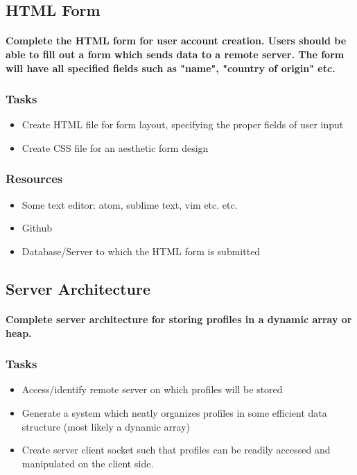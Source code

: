 \documentclass[12pt]{article}
\begin{document}
		\subsection{\bf HTML Form }
			\paragraph{Complete the HTML form for user account creation. Users should be able to fill out a form which sends data to a remote server. The form will have all specified fields such as "name", "country of origin" etc.}
			\subsubsection{\bf Tasks}
				\begin{itemize}
					\item Create HTML file for form layout, specifying the proper fields of user input
					\item Create CSS file for an aesthetic form design
				\end{itemize}
	  	\subsubsection{\bf Resources}
				\begin{itemize}
 					\item Some text editor: atom, sublime text, vim etc. etc.
 					\item Github
			 		\item Database/Server to which the HTML form is submitted
				\end{itemize}

 		\subsection{\bf Server Architecture }
			\paragraph{ Complete server architecture for storing profiles in a dynamic array or heap.}
			\subsubsection{\bf Tasks}
				\begin{itemize}
					\item	Access/identify remote server on which profiles will be stored
					\item	Generate a system which neatly organizes profiles in some efficient data structure (most likely a dynamic array)
					\item Create server client socket such that profiles can be readily accessed and manipulated on the client side.
				\end{itemize}
\end{document}
